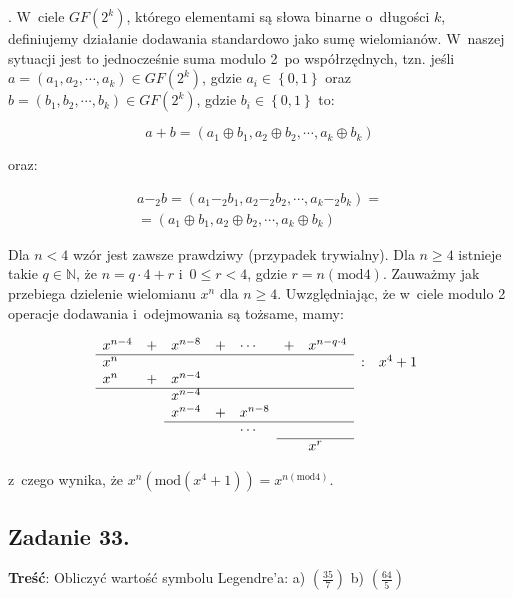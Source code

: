 \documentclass[a4paper,10pt, twocolumn]{article}
\begin{document}
. W~ciele $GF(2^{k})$, którego elementami są słowa binarne o~długości $k$, definiujemy działanie dodawania standardowo jako sumę wielomianów. W~naszej sytuacji jest to jednocześnie suma modulo 2~po współrzędnych, tzn. jeśli $a = (a_{1}, a_{2}, \cdots, a_{k}) \in GF(2^{k})$, gdzie $a_{i} \in \left\{0,1\right\}$ oraz $b = (b_{1}, b_{2}, \cdots, b_{k}) \in GF(2^{k})$, gdzie $b_{i} \in \left\{0,1\right\}$ to:

\begin{equation*}
	a + b = (a_{1} \oplus b_{1}, a_{2} \oplus b_{2}, \cdots, a_{k} \oplus b_{k})
\end{equation*}

\noindent oraz:

\begin{equation*}
	\begin{array}{c} a -_{2} b = (a_{1} -_{2} b_{1}, a_{2} -_{2} b_{2}, \cdots, a_{k} -_{2} b_{k}) = \\ = (a_{1} \oplus b_{1}, a_{2} \oplus b_{2}, \cdots, a_{k} \oplus b_{k}) \end{array}
\end{equation*}

\noindent Dla $n < 4$ wzór jest zawsze prawdziwy (przypadek trywialny). Dla $n \geq 4$ istnieje takie $q \in \mathbb{N}$, że $n = q \cdot 4 + r$ i~$0 \leq r < 4$, gdzie $r = n (\text{mod} 4)$. Zauważmy jak przebiega dzielenie wielomianu $x^{n}$ dla $n \geq 4$. Uwzględniając, że w~ciele modulo 2 operacje dodawania i~odejmowania są tożsame, mamy:

\begin{equation*}
	\begin{array}{lllllllll} 
		x^{n-4} & + & x^{n-8} & + & \cdots & + & x^{n-q \cdot 4} & & \\
		\cline{1-7}
		x^{n} & & & & & & & : & x^{4} + 1 \\
		x^{n} & + & x^{n-4} & & & & & & \\
		\cline{1-7}
		& & x^{n-4} & & & & & & \\
		& & x^{n-4} & + & x^{n-8} & & & & \\
		\cline{3-7}
		& & & & \cdots & & & & \\
		\cline{6-7}
		& & & & & & x^{r} & & \\
	\end{array}
\end{equation*}

\noindent z~czego wynika, że $x^{n} (\text{mod}(x^{4} + 1 )) = x^{n(\text{mod}4)}$.

\subsection{Zadanie 33.}
\textbf{Treść}: Obliczyć wartość symbolu Legendre'a: a) $(\frac{35}{7})$ b) $(\frac{64}{5})$
\end{document}
